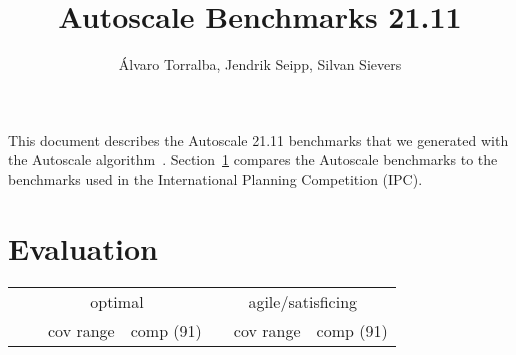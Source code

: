 \documentclass{article}
\title{Autoscale Benchmarks 21.11}
\author{\'Alvaro Torralba, Jendrik Seipp, Silvan Sievers}
\date{}
\begin{document}
        \maketitle

        This document describes the Autoscale 21.11 benchmarks that we generated with the Autoscale algorithm~\cite{autoscale}.
        Section~\ref{evaluation} compares the Autoscale benchmarks to the benchmarks used in the International Planning Competition (IPC).

        \tableofcontents

        \newpage \section{Evaluation}
\label{evaluation}
            \begin{table}[h] \centering \small
            \begin{tabular}{@{}lr|rrrrr|rrrrr@{}}
\multicolumn{2}{c}{} & \multicolumn{5}{c}{optimal} & \multicolumn{5}{c}{agile/satisficing} \\

\cmidrule{3-7} \cmidrule(l){8-12}

\multicolumn{2}{c}{} & \multicolumn{1}{c}{} & \multicolumn{2}{c}{cov range} & \multicolumn{2}{c}{comp (91)} & & \multicolumn{2}{c}{cov range} & \multicolumn{2}{c}{comp (91)} \\
\cmidrule{4-5} \cmidrule(l){6-7} \cmidrule{9-10} \cmidrule(l){11-12}


\end{tabular}
\end{table}
\end{document}
